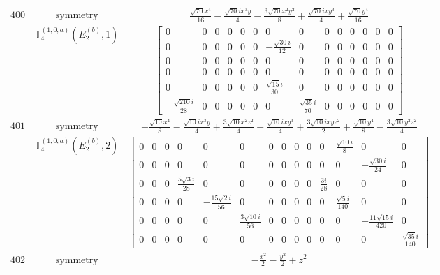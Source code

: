 \documentclass[fleqn,8pt,landscape]{jsarticle}
\begin{document}
\begin{longtable}{ccc}
$ 400 $ & $ \text{symmetry} $ & $ \frac{\sqrt{70} x^{4}}{16} - \frac{\sqrt{70} i x^{3} y}{4} - \frac{3 \sqrt{70} x^{2} y^{2}}{8} + \frac{\sqrt{70} i x y^{3}}{4} + \frac{\sqrt{70} y^{4}}{16} $ \\
$  $ & $ \mathbb{T}_{4}^{(1,0;a)}(E_{2}^{(b)},1) $ & $ \begin{bmatrix} 0 & 0 & 0 & 0 & 0 & 0 & 0 & 0 & 0 & 0 & 0 & 0 & 0 & 0 \\ 0 & 0 & 0 & 0 & 0 & 0 & - \frac{\sqrt{30} i}{12} & 0 & 0 & 0 & 0 & 0 & 0 & 0 \\ 0 & 0 & 0 & 0 & 0 & 0 & 0 & 0 & 0 & 0 & 0 & 0 & 0 & 0 \\ 0 & 0 & 0 & 0 & 0 & 0 & 0 & 0 & 0 & 0 & 0 & 0 & 0 & 0 \\ 0 & 0 & 0 & 0 & 0 & 0 & \frac{\sqrt{15} i}{30} & 0 & 0 & 0 & 0 & 0 & 0 & 0 \\ - \frac{\sqrt{210} i}{28} & 0 & 0 & 0 & 0 & 0 & 0 & \frac{\sqrt{35} i}{70} & 0 & 0 & 0 & 0 & 0 & 0 \end{bmatrix} $ \\ \hline
$ 401 $ & $ \text{symmetry} $ & $ - \frac{\sqrt{10} x^{4}}{8} - \frac{\sqrt{10} i x^{3} y}{4} + \frac{3 \sqrt{10} x^{2} z^{2}}{4} - \frac{\sqrt{10} i x y^{3}}{4} + \frac{3 \sqrt{10} i x y z^{2}}{2} + \frac{\sqrt{10} y^{4}}{8} - \frac{3 \sqrt{10} y^{2} z^{2}}{4} $ \\
$  $ & $ \mathbb{T}_{4}^{(1,0;a)}(E_{2}^{(b)},2) $ & $ \begin{bmatrix} 0 & 0 & 0 & 0 & 0 & 0 & 0 & 0 & 0 & 0 & 0 & \frac{\sqrt{10} i}{8} & 0 & 0 \\ 0 & 0 & 0 & 0 & 0 & 0 & 0 & 0 & 0 & 0 & 0 & 0 & - \frac{\sqrt{30} i}{24} & 0 \\ 0 & 0 & 0 & \frac{5 \sqrt{3} i}{28} & 0 & 0 & 0 & 0 & 0 & 0 & \frac{3 i}{28} & 0 & 0 & 0 \\ 0 & 0 & 0 & 0 & - \frac{15 \sqrt{2} i}{56} & 0 & 0 & 0 & 0 & 0 & 0 & \frac{\sqrt{5} i}{140} & 0 & 0 \\ 0 & 0 & 0 & 0 & 0 & \frac{3 \sqrt{10} i}{56} & 0 & 0 & 0 & 0 & 0 & 0 & - \frac{11 \sqrt{15} i}{420} & 0 \\ 0 & 0 & 0 & 0 & 0 & 0 & 0 & 0 & 0 & 0 & 0 & 0 & 0 & \frac{\sqrt{35} i}{140} \end{bmatrix} $ \\ \hline
$ 402 $ & $ \text{symmetry} $ & $ - \frac{x^{2}}{2} - \frac{y^{2}}{2} + z^{2} $ \\

\end{longtable}
\end{document}
